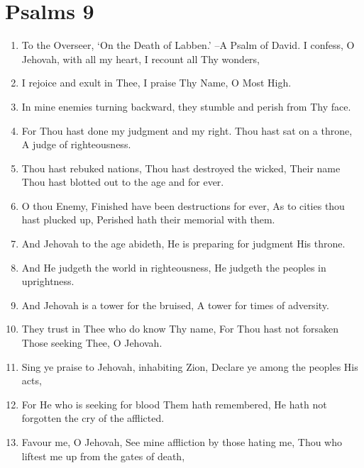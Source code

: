 \documentclass[]{article}
\begin{document}
	\section{Psalms 9}
	\label{sec:Ps}
\begin{enumerate}
\item To the Overseer, `On the Death of Labben.' --A Psalm of David. I confess, O Jehovah, with all my heart, I recount all Thy wonders,

\item I rejoice and exult in Thee, I praise Thy Name, O Most High.

\item In mine enemies turning backward, they stumble and perish from Thy face.

\item For Thou hast done my judgment and my right. Thou hast sat on a throne, A judge of righteousness.

\item Thou hast rebuked nations, Thou hast destroyed the wicked, Their name Thou hast blotted out to the age and for ever.

\item O thou Enemy, Finished have been destructions for ever, As to cities thou hast plucked up, Perished hath their memorial with them.

\item And Jehovah to the age abideth, He is preparing for judgment His throne.

\item And He judgeth the world in righteousness, He judgeth the peoples in uprightness.

\item And Jehovah is a tower for the bruised, A tower for times of adversity.

\item They trust in Thee who do know Thy name, For Thou hast not forsaken Those seeking Thee, O Jehovah.

\item Sing ye praise to Jehovah, inhabiting Zion, Declare ye among the peoples His acts,

\item For He who is seeking for blood Them hath remembered, He hath not forgotten the cry of the afflicted.

\item Favour me, O Jehovah, See mine affliction by those hating me, Thou who liftest me up from the gates of death,


\end{enumerate}
\end{document}
